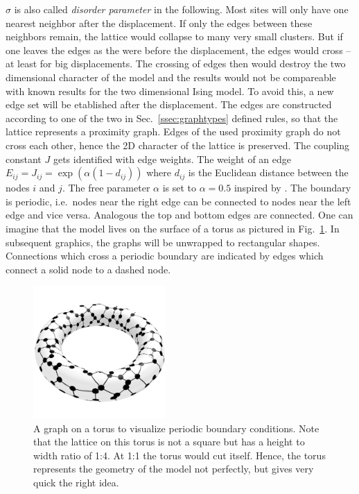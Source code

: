     \(\sigma\) is also called \emph{disorder parameter} in the following.
    Most sites will only have one nearest neighbor after the
    displacement. If only the edges between these neighbors remain,
    the lattice would collapse to many very small clusters. But if one
    leaves the edges as the were before the displacement, the edges would
    cross -- at least for big displacements. The crossing of edges then
    would destroy the two dimensional character of the model and the results
    would not be compareable with known results for the two dimensional
    Ising model.
    To avoid this, a new edge set will be etablished after the displacement.
    The edges are constructed according to
    one of the two in Sec.\ \ref{ssec:graphtypes} defined rules,
    so that the lattice represents a proximity graph. Edges
    of the used proximity graph do not cross each other, hence the 2D
    character of the lattice is preserved. The coupling constant \(J\) gets
    identified with edge weights. The weight of an edge \(E_{ij} =
    J_{ij} = \exp (\alpha (1-d_{ij}))\) where \(d_{ij}\) is the Euclidean
    distance between the nodes \(i\) and \(j\). The free parameter
    \(\alpha\) is set to \(\alpha = 0.5\) inspired by \cite{Lima2000}.
    The boundary is periodic, i.e.\ nodes near the right edge can be
    connected to nodes near the left edge and vice versa. Analogous the
    top and bottom edges are connected. One can imagine that the model
    lives on the surface of a torus as pictured in Fig.\ \ref{fig:torusRNG}.
    In subsequent graphics, the graphs will be unwrapped to rectangular
    shapes. Connections which cross a periodic boundary are indicated
    by edges which connect a solid node to a dashed node.
    \begin{figure}[htbp]
        \centering
        \includegraphics[width=0.45\textwidth]{images/torus}
        \caption[A Graph on a Torus to Visualise Periodic Boundary Conditions]
        {
            A graph on a torus to visualize periodic boundary conditions.
            Note that the lattice on this torus is not a square but has
            a height to width ratio of 1:4. At 1:1 the torus would cut
            itself. Hence, the torus represents the geometry of the model
            not perfectly, but gives very quick the right idea.
        }
        \label{fig:torusRNG}
    \end{figure}\\
